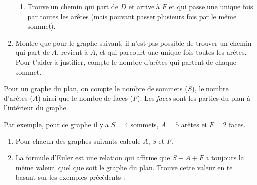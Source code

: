 \documentclass[class=report,crop=false, 12pt]{standalone}
\begin{document}
\begin{activite}
\begin{enumerate}
\begin{enumerate}
    \item Trouve un chemin qui part de $D$ et arrive à $F$ et qui passe une unique fois par toutes les arêtes (mais pouvant passer plusieurs fois par le même sommet).  
  \end{enumerate} 
  

 
 
  \item Montre que pour le graphe suivant, il n'est pas possible de trouver un chemin qui part de $A$, revient à $A$, et qui parcourt une unique fois toutes les arêtes. Pour t'aider à justifier, compte le nombre d'arêtes qui partent de chaque sommet.


\end{enumerate}
      
   
\end{activite}


\begin{activite}
Pour un graphe du plan, on compte le nombre de sommets ($S$), le nombre d'arêtes ($A$) ainsi que le nombre de faces ($F$). Les \emph{faces} sont les parties du plan à l'intérieur du graphe.

Par exemple, pour ce graphe il y a $S=4$ sommets, $A=5$ arêtes et $F=2$ faces.


    

 
\begin{enumerate}
  \item	Pour chacun des graphes suivants calcule $A$, $S$ et $F$.
      
  
  \item La formule d'Euler est une relation qui affirme que $S-A+F$ a toujours la même valeur, quel que soit le graphe du plan. Trouve cette valeur en te basant sur les exemples précédents :
  
 {\large 
} 
\end{enumerate}
    

\end{activite}
\end{document}
